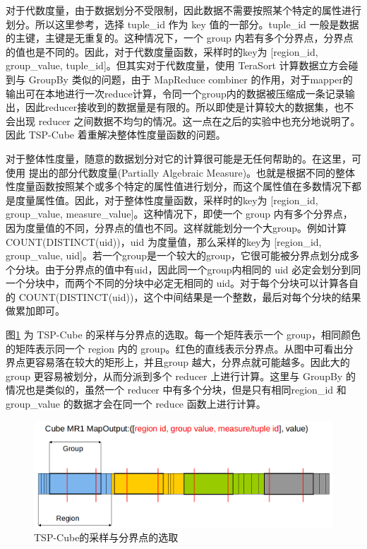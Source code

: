 对于代数度量，由于数据划分不受限制，因此数据不需要按照某个特定的属性进行划分。所以这里参考\cite{tao2013minimal}，选择 tuple\_id 作为 key 值的一部分。tuple\_id 一般是数据的主键，主键是无重复的。这种情况下，一个 group 内若有多个分界点，分界点的值也是不同的。因此，对于代数度量函数，采样时的key为 [region\_id, group\_value, tuple\_id]。但其实对于代数度量，使用 TeraSort 计算数据立方会碰到与 GroupBy 类似的问题，由于 MapReduce combiner 的作用，对于mapper的输出可在本地进行一次reduce计算，令同一个group内的数据被压缩成一条记录输出，因此reducer接收到的数据量是有限的。所以即使是计算较大的数据集，也不会出现 reducer 之间数据不均匀的情况。这一点在之后的实验中也充分地说明了。因此 TSP-Cube 着重解决整体性度量函数的问题。

对于整体性度量，随意的数据划分对它的计算很可能是无任何帮助的。在这里，可使用 \cite{nandi2011distributed} 提出的部分代数度量(Partially Algebraic Measure)。也就是根据不同的整体性度量函数按照某个或多个特定的属性值进行划分，而这个属性值在多数情况下都是度量属性值。因此，对于整体性度量函数，采样时的key为 [region\_id, group\_value, measure\_value]。这种情况下，即使一个 group 内有多个分界点，因为度量值的不同，分界点的值也不同。这样就能划分一个大group。例如计算 COUNT(DISTINCT(uid))，uid 为度量值，那么采样的key为 [region\_id, group\_value, uid]。若一个group是一个较大的group，它很可能被分界点划分成多个分块。由于分界点的值中有uid，因此同一个group内相同的 uid 必定会划分到同一个分块中，而两个不同的分块中必定无相同的 uid。对于每个分块可以计算各自的 COUNT(DISTINCT(uid))，这个中间结果是一个整数，最后对每个分块的结果做累加即可。

图\ref{tscube_picture} 为 TSP-Cube 的采样与分界点的选取。每一个矩阵表示一个 group，相同颜色的矩阵表示同一个 region 内的 group。红色的直线表示分界点。从图中可看出分界点更容易落在较大的矩形上，并且group 越大，分界点就可能越多。因此大的 group 更容易被划分，从而分派到多个 reducer 上进行计算。这里与 GroupBy 的情况也是类似的，虽然一个 reducer 中有多个分块，但是只有相同region\_id 和 group\_value 的数据才会在同一个 reduce 函数上进行计算。

\begin{figure}[!htb] 
\centering\includegraphics[width=6in]{picture/ch_terasort_mr/tscube_picture} 
\caption{TSP-Cube的采样与分界点的选取}\label{tscube_picture} 
\end{figure}

